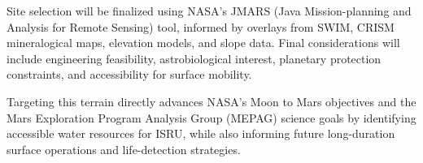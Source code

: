 Site selection will be finalized using NASA’s JMARS (Java Mission-planning and Analysis for Remote Sensing) tool, informed by overlays from SWIM, CRISM mineralogical maps, elevation models, and slope data. Final considerations will include engineering feasibility, astrobiological interest, planetary protection constraints, and accessibility for surface mobility.

Targeting this terrain directly advances NASA’s Moon to Mars objectives and the Mars Exploration Program Analysis Group (MEPAG) science goals by identifying accessible water resources for ISRU, while also informing future long-duration surface operations and life-detection strategies.
